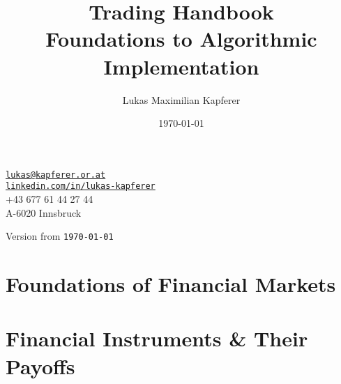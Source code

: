\documentclass[a4paper, titlepage]{book} %
\title{Trading Handbook\\\large Foundations to Algorithmic Implementation}
\author{Lukas Maximilian Kapferer}
\date{\today}
\begin{document}

\begin{titlepage}
    \centering
    \vspace*{3cm}
    {\LARGE \textbf{\thetitle} \par}
    \vspace{2cm}
    {\large \protect\theauthor\par}
    \vspace{0.5cm}
    \small
    \texttt{\href{mailto:lukas@kapferer.or.at}{lukas@kapferer.or.at}}\\
    \texttt{\href{https://www.linkedin.com/in/lukas-kapferer}{linkedin.com/in/lukas-kapferer}}\\
    +43 677 61 44 27 44\\
    A-6020 Innsbruck \par
    \vspace{0.5cm}
    Version from \texttt{\today}
\end{titlepage}

\tableofcontents
\listoffigures  %
\listoftables   %
\printglossary[type=\acronymtype,title={List of Abbreviations}] %
\printglossary[title={Glossary of Terms}]                       %


\part{Foundations of Financial Markets}\label{part:foundations}






\part{Financial Instruments \& Their Payoffs}\label{part:instruments}





\end{document}
